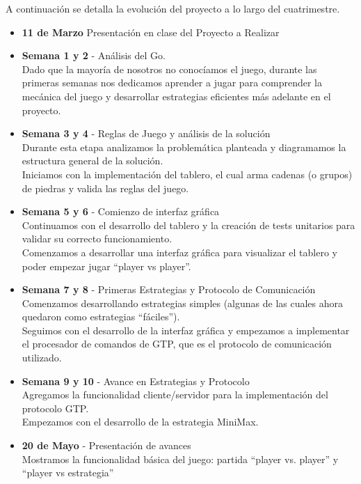 \documentclass[11pt]{article}
\begin{document}
A continuaci\'on se detalla la evoluci\'on del proyecto a lo largo del cuatrimestre.

\begin{itemize}
 \item \textbf{11 de Marzo} Presentaci\'on en clase del Proyecto a Realizar
 \item \textbf{Semana 1 y 2} - An\'alisis del Go. \\
	Dado que la mayor\'ia de nosotros no conoc\'iamos el juego, durante las primeras semanas nos dedicamos aprender a jugar para 
	comprender la mec\'anica del juego y desarrollar estrategias eficientes m\'as adelante en el proyecto. 

  \item \textbf{Semana 3 y 4} - Reglas de Juego y an\'alisis de la soluci\'on\\
	Durante esta etapa analizamos la problem\'atica planteada y diagramamos la estructura general de la soluci\'on.\\
	Iniciamos con la implementaci\'on del tablero, el cual arma cadenas (o grupos) de piedras y valida las reglas del juego.

  \item \textbf{Semana 5 y 6} - Comienzo de interfaz gr\'afica\\
        Continuamos con el desarrollo del tablero y la creaci\'on de tests unitarios para validar su correcto funcionamiento.\\
	Comenzamos a desarrollar una interfaz gr\'afica para visualizar el tablero y poder empezar jugar ``player vs player''.

  \item \textbf{Semana 7 y 8} - Primeras Estrategias y Protocolo de Comunicaci\'on\\
	Comenzamos desarrollando estrategias simples (algunas de las cuales ahora quedaron como estrategias ``f\'aciles''). \\
	Seguimos con el desarrollo de la interfaz gr\'afica y empezamos a implementar el procesador de comandos de GTP, que es el protocolo de comunicaci\'on utilizado.

  \item \textbf{Semana 9 y 10} - Avance en Estrategias y Protocolo\\
	Agregamos la funcionalidad cliente/servidor para la implementaci\'on del protocolo GTP. \\
	Empezamos con el desarrollo de la estrategia MiniMax.

  \item \textbf{20 de Mayo} - Presentaci\'on de avances\\
	Mostramos la funcionalidad b\'asica del juego: partida ``player vs. player'' y ``player vs estrategia''
 

\end{itemize}
\end{document}
